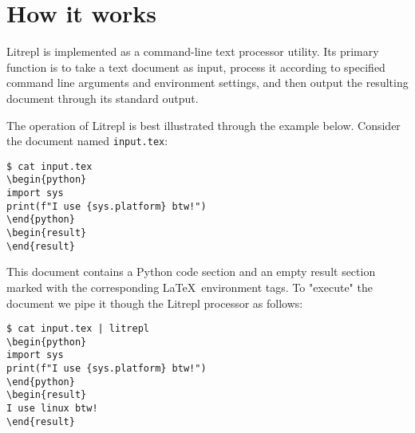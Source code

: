 \documentclass[a4paper,12pt,twocolumn]{article}
\newcommand{\Latex}{\LaTeX\ }
\begin{document}
\section{How it works}

Litrepl is implemented as a command-line text processor utility. Its primary
function is to take a text document as input, process it according to specified
command line arguments and environment settings, and then output the resulting
document through its standard output.

The operation of Litrepl is best illustrated through the example below. Consider
the document named \verb|input.tex|:

\begin{comment}
\begin{sh}
echo '\begin{verbatim}'
echo '$ cat input.tex'
cat input.tex
echo '\end{verbatim}'
\end{sh}
\end{comment}
\begin{verbatim}
$ cat input.tex
\begin{python}
import sys
print(f"I use {sys.platform} btw!")
\end{python}
\begin{result}
\end{result}
\end{verbatim}

This document contains a Python code section and an empty result section marked
with the corresponding \Latex environment tags. To "execute" the document we
pipe it though the Litrepl processor as follows:

\begin{comment}
\begin{sh}
echo '\begin{verbatim}'
echo '$ cat input.tex | litrepl'
echo "sys.platform='linux'" | litrepl repl python >/dev/null
cat input.tex | litrepl
echo '\end{verbatim}'
\end{sh}
\end{comment}
\begin{verbatim}
$ cat input.tex | litrepl
\begin{python}
import sys
print(f"I use {sys.platform} btw!")
\end{python}
\begin{result}
I use linux btw!
\end{result}
\end{verbatim}
\end{document}
